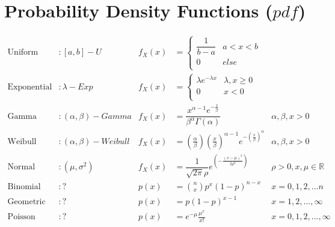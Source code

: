 \documentclass[10pt]{report}
\begin{document}
\pagebreak

\section*{Probability Density Functions ($pdf$)}
\begin{align*}
\text{Uniform}& : [a,b]-U& f_{X}(x) & = 
	\begin{cases}
	\dfrac{1}{b-a}& a < x < b\\
	0& else\\
	\end{cases}\\
\text{Exponential}& : \lambda-Exp& f_{X}(x) & = 
	\begin{cases}
	\lambda e^{-\lambda x}& \lambda, x \geq 0\\
	0& x < 0\\
	\end{cases}\\
\text{Gamma}& : (\alpha, \beta)-Gamma& f_{X}(x) & = \dfrac{x^{\alpha-1}e^{-\frac{x}{\beta}}}{\beta^{\alpha}\Gamma(\alpha)}& \alpha,\beta,x > 0\\
\text{Weibull}& : (\alpha, \beta)-Weibull& f_{X}(x) & = \left(\frac{\alpha}{\beta}\right)\left(\frac{x}{\beta}\right)^{\alpha-1}e^{-\left(\frac{x}{\beta}\right)^{\alpha}}& \alpha,\beta,x > 0\\
\text{Normal}& : (\mu, \sigma^{2})& f_{X}(x) & = \dfrac{1}{\sqrt{2\pi}\rho}e^{\left(-\frac{\left(x-\mu\right)^{2}}{2\rho^{2}}\right)}& \rho > 0,  x,\mu \in \mathbb{R}\\
\text{Binomial}& : ?& p(x) & = \binom{n}{x}p^{x}\left(1-p\right)^{n-x}& x=0,1,2,...n\\
\text{Geometric}& : ?& p(x) & = p\left(1-p\right)^{x-1}& x=1,2,...,\infty\\
\text{Poisson}& : ?& p(x) & = e^{-\mu}\frac{\mu^{x}}{x!}& x=0,1,2,...,\infty\\
\end{align*}

\pagebreak
\end{document}
